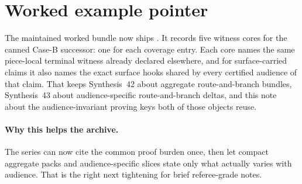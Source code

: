 \documentclass[11pt]{article}
\begin{document}
\section{Worked example pointer}
The maintained worked bundle now ships .\cite{series:workedexample}
It records five witness cores for the canned Case-B successor: one for each coverage entry.
Each core names the same piece-local terminal witness already declared elsewhere, and for surface-carried claims it also names the exact surface hooks shared by every certified audience of that claim.
That keeps Synthesis~42 about aggregate route-and-branch bundles, Synthesis~43 about audience-specific route-and-branch deltas, and this note about the audience-invariant proving keys both of those objects reuse.\cite{series:challengecoveragewitnesspacks,series:challengecoveragewitnessslices}

\paragraph{Why this helps the archive.}
The series can now cite the common proof burden once, then let compact aggregate packs and audience-specific slices state only what actually varies with audience.
That is the right next tightening for brief referee-grade notes.
\end{document}
